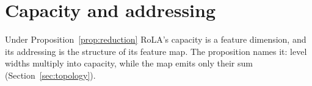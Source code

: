 %
%
%
\section{Capacity and addressing}
\label{sec:capacity}

Under Proposition~\ref{prop:reduction} RoLA's capacity is a feature dimension, and its addressing is the structure of its feature map. The proposition names it: level widths multiply into capacity, while the map emits only their sum (Section~\ref{sec:topology}).

